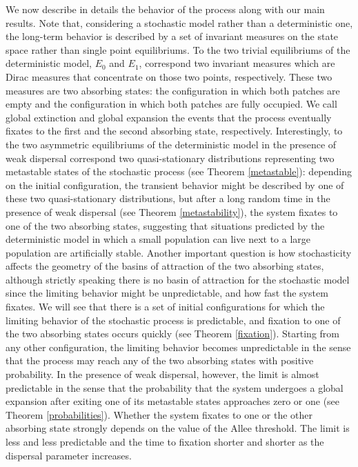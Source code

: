 \indent We now describe in details the behavior of the process along with our main results.
 Note that, considering a stochastic model rather than a deterministic one, the long-term behavior is
 described by a set of invariant measures on the state space rather than single point equilibriums.
 To the two trivial equilibriums of the deterministic model, $E_0$ and $E_1$, correspond two invariant measures which are
 Dirac measures that concentrate on those two points, respectively.
 These two measures are two absorbing states: the configuration in which both patches are empty and the configuration in
 which both patches are fully occupied.
 We call global extinction and global expansion the events that the process eventually fixates to the first and the second
 absorbing state, respectively.
 Interestingly, to the two asymmetric equilibriums of the deterministic model in the presence of weak dispersal correspond
 two quasi-stationary distributions representing two metastable states of the stochastic process (see
 Theorem \ref{metastable}): depending on the initial configuration, the transient behavior might be described by one of
 these two quasi-stationary distributions, but after a long random time in the presence of weak dispersal (see
 Theorem \ref{metastability}), the system fixates to one of the two absorbing states, suggesting that situations predicted
 by the deterministic model in which a small population can live next to a large population are artificially stable.
 Another important question is how stochasticity affects the geometry of the basins of attraction of the two absorbing
 states, although strictly speaking there is no basin of attraction for the stochastic model since the limiting behavior
 might be unpredictable, and how fast the system fixates.
 We will see that there is a set of initial configurations for which the limiting behavior of the stochastic process is
 predictable, and fixation to one of the two absorbing states occurs quickly (see Theorem \ref{fixation}).
 Starting from any other configuration, the limiting behavior becomes unpredictable in the sense that the process may
 reach any of the two absorbing states with positive probability.
 In the presence of weak dispersal, however, the limit is almost predictable in the sense that the probability that the
 system undergoes a global expansion after exiting one of its metastable states approaches zero or one (see
 Theorem \ref{probabilities}).
 Whether the system fixates to one or the other absorbing state strongly depends on the value of the Allee threshold.
 The limit is less and less predictable and the time to fixation shorter and shorter as the dispersal parameter increases.

